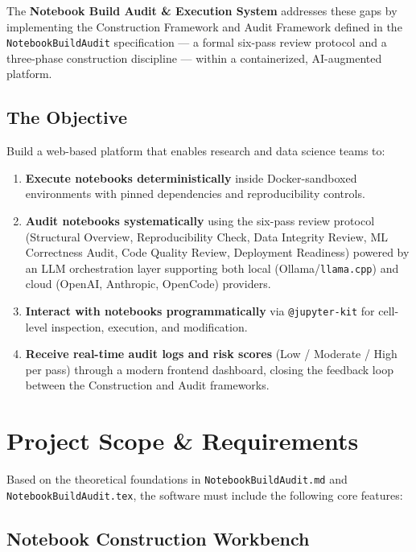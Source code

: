 \documentclass[11pt, a4paper]{article}
\begin{document}
The \textbf{Notebook Build Audit \& Execution System} addresses these gaps by
implementing the Construction Framework and Audit Framework defined in the
\texttt{NotebookBuildAudit} specification --- a formal six-pass review protocol
and a three-phase construction discipline --- within a containerized, AI-augmented
platform.

\subsection*{The Objective}

Build a web-based platform that enables research and data science teams to:

\begin{enumerate}
  \item \textbf{Execute notebooks deterministically} inside Docker-sandboxed
    environments with pinned dependencies and reproducibility controls.

  \item \textbf{Audit notebooks systematically} using the six-pass review protocol
    (Structural Overview, Reproducibility Check, Data Integrity Review, ML
    Correctness Audit, Code Quality Review, Deployment Readiness) powered by an
    LLM orchestration layer supporting both local (Ollama/\texttt{llama.cpp}) and
    cloud (OpenAI, Anthropic, OpenCode) providers.

  \item \textbf{Interact with notebooks programmatically} via \texttt{@jupyter-kit}
    for cell-level inspection, execution, and modification.

  \item \textbf{Receive real-time audit logs and risk scores} (Low / Moderate /
    High per pass) through a modern frontend dashboard, closing the feedback loop
    between the Construction and Audit frameworks.
\end{enumerate}

\section{Project Scope \& Requirements}

Based on the theoretical foundations in \texttt{NotebookBuildAudit.md} and
\texttt{NotebookBuildAudit.tex}, the software must include the following core
features:

\subsection*{Notebook Construction Workbench}
\end{document}
